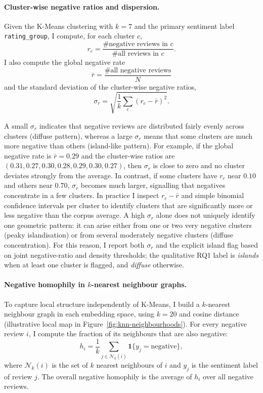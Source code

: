 \documentclass[a4paper,11pt]{article}
\begin{document}
\paragraph{Cluster-wise negative ratios and dispersion.}

Given the K-Means clustering with $k = 7$ and the primary sentiment label \texttt{rating\_group}, I compute, for each cluster $c$,
\[
r_c = \frac{\text{\# negative reviews in } c}{\text{\# all reviews in } c}.
\]
I also compute the global negative rate
\[
\bar{r} = \frac{\text{\# all negative reviews}}{N}
\]
and the standard deviation of the cluster-wise negative ratios,
\[
\sigma_r = \sqrt{\frac{1}{k} \sum_{c} (r_c - \bar{r})^2}.
\]

A small $\sigma_r$ indicates that negative reviews are distributed fairly evenly across clusters (diffuse pattern), whereas a large $\sigma_r$ means that some clusters are much more negative than others (island-like pattern). 
For example, if the global negative rate is $\bar{r} = 0.29$ and the cluster-wise ratios are $(0.31, 0.27, 0.30, 0.28, 0.29, 0.30, 0.27)$, then $\sigma_r$ is close to zero and no cluster deviates strongly from the average. 
In contrast, if some clusters have $r_c$ near $0.10$ and others near $0.70$, $\sigma_r$ becomes much larger, signalling that negatives concentrate in a few clusters. 
In practice I inspect $r_c - \bar{r}$ and simple binomial confidence intervals per cluster to identify clusters that are significantly more or less negative than the corpus average.
A high $\sigma_r$ alone does not uniquely identify one geometric pattern: it can arise either from one or two very negative clusters (peaky islandisation) or from several moderately negative clusters (diffuse concentration). 
For this reason, I report both $\sigma_r$ and the explicit island flag based on joint negative-ratio and density thresholds; the qualitative RQ1 label is \textit{islands} when at least one cluster is flagged, and \textit{diffuse} otherwise.

\paragraph{Negative homophily in $k$-nearest neighbour graphs.}

To capture local structure independently of K-Means, I build a $k$-nearest neighbour graph in each embedding space, using $k = 20$ and cosine distance (illustrative local map in Figure~\ref{fig:knn-neighbourhoods}). 
For every negative review $i$, I compute the fraction of its neighbours that are also negative:
\[
h_i = \frac{1}{k} \sum_{j \in \mathcal{N}_k(i)} \mathbf{1}\{ y_j = \text{negative} \},
\]
where $\mathcal{N}_k(i)$ is the set of $k$ nearest neighbours of $i$ and $y_j$ is the sentiment label of review $j$. 
The overall negative homophily is the average of $h_i$ over all negative reviews. 
\end{document}
